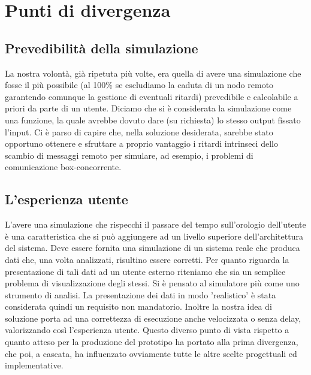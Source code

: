 \section{Punti di divergenza}
\subsection{Prevedibilità della simulazione}
La nostra volontà, già ripetuta più volte, era quella di avere una simulazione che fosse il più possibile (al 100\% se escludiamo la caduta di un nodo remoto garantendo comunque la gestione di eventuali ritardi) prevedibile e calcolabile a priori da parte di un utente. Diciamo che si è considerata la simulazione come una funzione, la quale avrebbe dovuto dare (su richiesta) lo stesso output fissato l'input. 
Ci è parso di capire che, nella soluzione desiderata, sarebbe stato opportuno ottenere e sfruttare a proprio vantaggio i ritardi intrinseci dello scambio di messaggi remoto per simulare, ad esempio, i problemi di comunicazione box-concorrente.
\subsection{L'esperienza utente}
L’avere una simulazione che rispecchi il passare del tempo sull’orologio dell’utente è una caratteristica che si può aggiungere ad un livello superiore dell’architettura del sistema. Deve essere fornita una simulazione di un sistema reale che produca dati che, una volta analizzati, risultino essere corretti. Per quanto riguarda la presentazione di tali dati ad un utente esterno riteniamo che sia un semplice problema di visualizzazione degli stessi. Si è pensato al simulatore più come uno strumento di analisi. La presentazione dei dati in modo 'realistico' è stata considerata quindi un requisito non mandatorio. Inoltre la nostra idea di soluzione porta ad una correttezza di esecuzione anche velocizzata o senza delay, valorizzando così l’esperienza utente.
Questo diverso punto di vista rispetto a quanto atteso per la produzione del prototipo ha portato alla prima divergenza, che poi, a cascata, ha influenzato ovviamente tutte le altre scelte progettuali ed implementative.
